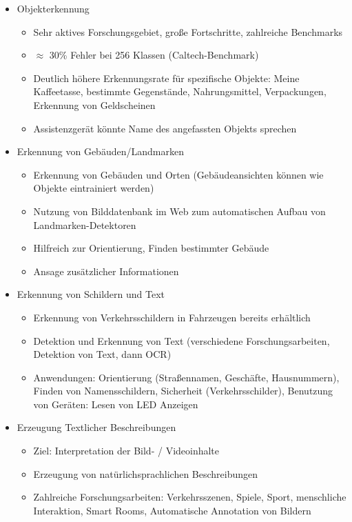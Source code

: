\documentclass[paper=a4, fontsize=11pt]{scrartcl} %
\numberwithin{equation}{section} %
\numberwithin{figure}{section} %
\numberwithin{table}{section} %
\begin{document}
\begin{itemize}
\item Objekterkennung
\begin{itemize}
\item Sehr aktives Forschungsgebiet, große Fortschritte, zahlreiche Benchmarks
\item $\approx$ 30\% Fehler bei 256 Klassen (Caltech-Benchmark)
\item Deutlich höhere Erkennungsrate für spezifische Objekte: Meine Kaffeetasse, bestimmte Gegenstände, Nahrungsmittel, Verpackungen, Erkennung von Geldscheinen
\item Assistenzgerät könnte Name des angefassten Objekts sprechen
\end{itemize}
\item Erkennung von Gebäuden/Landmarken
\begin{itemize}
\item Erkennung von Gebäuden und Orten (Gebäudeansichten können wie Objekte eintrainiert werden)
\item Nutzung von Bilddatenbank im Web zum automatischen Aufbau von Landmarken-Detektoren
\item Hilfreich zur Orientierung, Finden bestimmter Gebäude
\item Ansage zusätzlicher Informationen
\end{itemize}
\item Erkennung von Schildern und Text
\begin{itemize}
\item Erkennung von Verkehrsschildern in Fahrzeugen bereits erhältlich
\item Detektion und Erkennung von Text (verschiedene Forschungsarbeiten, Detektion von Text, dann OCR)
\item Anwendungen: Orientierung (Straßennamen, Geschäfte, Hausnummern), Finden von Namensschildern, Sicherheit (Verkehrsschilder), Benutzung von Geräten: Lesen von LED Anzeigen
\end{itemize}
\item Erzeugung Textlicher Beschreibungen
\begin{itemize}
\item Ziel: Interpretation der Bild- / Videoinhalte
\item Erzeugung von natürlichsprachlichen Beschreibungen
\item Zahlreiche Forschungsarbeiten: Verkehrsszenen, Spiele, Sport, menschliche Interaktion, Smart Rooms, Automatische Annotation von Bildern
\end{itemize}
\end{itemize}
\end{document}
